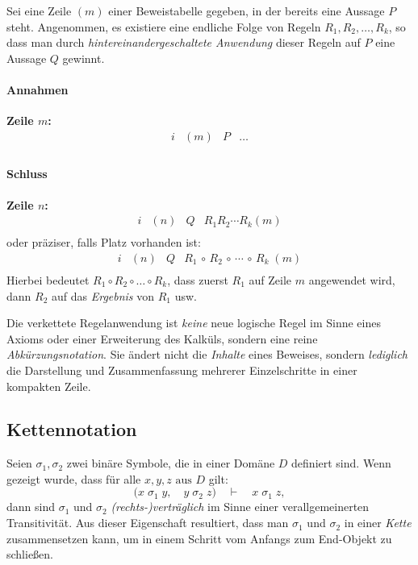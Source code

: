 \documentclass[main.tex]{subfiles}
\begin{document}
\begin{definition}
Sei eine Zeile \((m)\) einer Beweistabelle gegeben, in der bereits eine Aussage \(P\) steht. Angenommen, es existiere eine endliche Folge von Regeln \(R_1, R_2, \dots, R_k\), so dass man durch \emph{hintereinandergeschaltete Anwendung} dieser Regeln auf \(P\) eine Aussage \(Q\) gewinnt.

\paragraph{Annahmen}
\textbf{Zeile \(m\):}
\[
\begin{array}{llll}
   i & (m) & P & \dots \\
\end{array}
\]

\paragraph{Schluss}
\textbf{Zeile \(n\):}
\[
\begin{array}{llll}
   i & (n) & Q & R_1R_2\cdots R_k(m) \\
\end{array}
\]
oder präziser, falls Platz vorhanden ist:
\[
\begin{array}{llll}
   i 
   & (n) 
   & Q 
   & R_1 \,\circ\, R_2 \,\circ\,\cdots\,\circ\, R_k \;(m) \\
\end{array}
\]
Hierbei bedeutet \(R_1 \circ R_2 \circ \dots \circ R_k\), dass zuerst \(R_1\) auf Zeile \(m\) angewendet wird, dann \(R_2\) auf das \emph{Ergebnis} von \(R_1\) usw.
\end{definition}

\begin{remark}
Die verkettete Regelanwendung ist \emph{keine} neue logische Regel im Sinne eines Axioms oder einer Erweiterung des Kalküls, sondern eine reine \emph{Abkürzungsnotation}. Sie ändert nicht die \emph{Inhalte} eines Beweises, sondern \emph{lediglich} die Darstellung und Zusammenfassung mehrerer Einzelschritte in einer kompakten Zeile.
\end{remark}

\subsection{Kettennotation}
\begin{definition}
\label{rule:Chain}
Seien \(\sigma_1,\sigma_2\) zwei binäre Symbole, die in einer Domäne \(D\) definiert sind.  
Wenn gezeigt wurde, dass für alle \(x,y,z \text{ aus } D\) gilt:
\[
\bigl(x \;\sigma_1\; y, \quad y \;\sigma_2\; z\bigr)
\quad\vdash\quad
x \;\sigma_1\; z,
\]
dann sind \(\sigma_1\) und \(\sigma_2\) \emph{(rechts-)verträglich} im Sinne einer verallgemeinerten Transitivität. Aus dieser Eigenschaft resultiert, dass man \(\sigma_1\) und \(\sigma_2\) in einer \emph{Kette} zusammensetzen kann, um in einem Schritt vom Anfangs\- zum End-Objekt zu schließen.
\end{definition}
\end{document}
